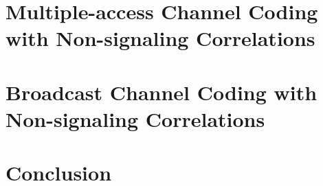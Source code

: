 \documentclass[a4paper, 11pt]{memoir}
\theoremstyle{remark}
\begin{document}


\cleardoublepage
{\let\newpage\relax
\chapter{Multiple-access Channel Coding with Non-signaling Correlations}
\label{chap:MAC}
}



\cleardoublepage
{\let\newpage\relax
  \chapter{Broadcast Channel Coding with Non-signaling Correlations}
\label{chap:Broadcast}
}




\chapter*{Conclusion}





\backmatter
\listoffigures
{}
\clearpage
\listoftables
{}
\end{document}
